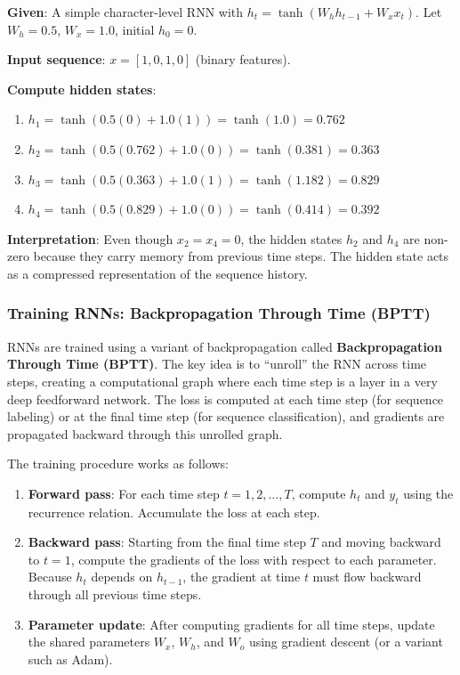 \documentclass[11pt,a4paper]{article}
\begin{document}
\begin{tcolorbox}[colback=yellow!5!white,colframe=yellow!75!black,title=\textbf{RNN Memory Mechanism: Numerical Example}]
\textbf{Given}: A simple character-level RNN with $h_t = \tanh(W_h h_{t-1} + W_x x_t)$. Let $W_h = 0.5$, $W_x = 1.0$, initial $h_0 = 0$.

\textbf{Input sequence}: $x = [1, 0, 1, 0]$ (binary features).

\textbf{Compute hidden states}:
\begin{enumerate}
    \item $h_1 = \tanh(0.5(0) + 1.0(1)) = \tanh(1.0) = 0.762$
    \item $h_2 = \tanh(0.5(0.762) + 1.0(0)) = \tanh(0.381) = 0.363$
    \item $h_3 = \tanh(0.5(0.363) + 1.0(1)) = \tanh(1.182) = 0.829$
    \item $h_4 = \tanh(0.5(0.829) + 1.0(0)) = \tanh(0.414) = 0.392$
\end{enumerate}

\textbf{Interpretation}: Even though $x_2 = x_4 = 0$, the hidden states $h_2$ and $h_4$ are non-zero because they carry memory from previous time steps. The hidden state acts as a compressed representation of the sequence history.
\end{tcolorbox}

\subsubsection{Training RNNs: Backpropagation Through Time (BPTT)}

RNNs are trained using a variant of backpropagation called \textbf{Backpropagation Through Time (BPTT)}. The key idea is to ``unroll'' the RNN across time steps, creating a computational graph where each time step is a layer in a very deep feedforward network. The loss is computed at each time step (for sequence labeling) or at the final time step (for sequence classification), and gradients are propagated backward through this unrolled graph.

The training procedure works as follows:
\begin{enumerate}
    \item \textbf{Forward pass}: For each time step $t = 1, 2, \ldots, T$, compute $h_t$ and $y_t$ using the recurrence relation. Accumulate the loss at each step.
    \item \textbf{Backward pass}: Starting from the final time step $T$ and moving backward to $t = 1$, compute the gradients of the loss with respect to each parameter. Because $h_t$ depends on $h_{t-1}$, the gradient at time $t$ must flow backward through all previous time steps.
    \item \textbf{Parameter update}: After computing gradients for all time steps, update the shared parameters $W_x$, $W_h$, and $W_o$ using gradient descent (or a variant such as Adam).
\end{enumerate}
\end{document}
